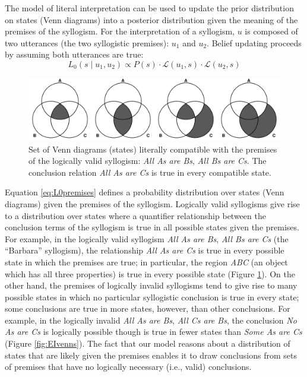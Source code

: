\documentclass[floatsintext, man]{apa6}
\begin{document}
The model of literal interpretation can be used to update the prior distribution on states (Venn diagrams) into a posterior distribution given the meaning of the premises of the syllogism. 
For the interpretation of a syllogism, $u$ is composed of two utterances (the two syllogistic premises): $u_1$ and $u_2$. 
Belief updating proceeds by assuming both utterances are true: 
\begin{equation}
L_0(s \mid u_1,  u_2) \propto P(s)\cdot \mathcal{L}(u_1, s) \cdot \mathcal{L}(u_2, s) 
\label{eq:L0premises}
\end{equation}


\begin{figure}[b]
\centering
\includegraphics[width = \textwidth]{diagrams_allAB_allBC.pdf}
\caption{Set of Venn diagrams (states) literally compatible with the premises of the logically valid syllogism: \emph{All As are Bs}, \emph{All Bs are Cs}. The conclusion relation \emph{All As are Cs} is true in every compatible state.}
\label{fig:AAvenns}
\end{figure}


Equation \ref{eq:L0premises} defines a probability distribution over states (Venn diagrams) given the premises of the syllogism. 
Logically valid syllogisms give rise to a distribution over states where a quantifier relationship between the conclusion terms of the syllogism is true in all possible states given the premises. 
For example, in the logically valid syllogism  \emph{All As are Bs}, \emph{All Bs are Cs} (the ``Barbara'' syllogism), the relationship \emph{All As are Cs} is true in every possible state in which the premises are true; in particular, the region \emph{ABC} (an object which has all three properties) is true in every possible state (Figure \ref{fig:AAvenns}).
On the other hand, the premises of logically invalid syllogisms tend to give rise to many possible states in which no particular syllogistic conclusion is true in every state; some conclusions are true in more states, however, than other conclusions.
For example, in the logically invalid \emph{All As are Bs}, \emph{All Cs are Bs}, the conclusion \emph{No As are Cs} is logically possible though is true in fewer states than \emph{Some As are Cs} (Figure \ref{fig:EIvenns}).
The fact that our model reasons about a distribution of states that are likely given the premises enables it to draw conclusions from sets of premises that have no logically necessary (i.e., valid) conclusions.
\end{document}
